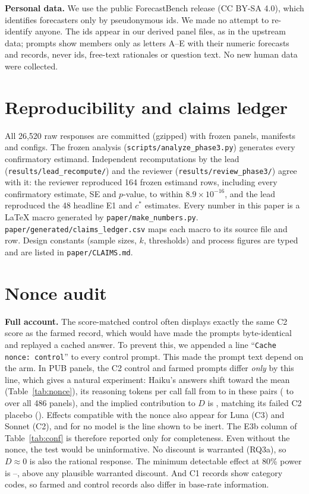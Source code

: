 \documentclass[11pt,letterpaper]{article}
\newcommand{\cstar}{c^{*}}
\begin{document}
\textbf{Personal data.} We use the public ForecastBench release (CC BY-SA 4.0), which identifies forecasters only by
pseudonymous ids. We made no attempt to re-identify anyone. The ids appear in our derived panel files, as in the
upstream data; prompts show members only as letters A--E with their numeric forecasts and records, never ids,
free-text rationales or question text. No new human data were collected.

\section{Reproducibility and claims ledger}\label{app:repro}
All 26,520 raw responses are committed (gzipped) with frozen panels, manifests and configs. The frozen analysis
(\texttt{scripts/analyze\_phase3.py}) generates every confirmatory estimand. Independent recomputations by the lead
(\texttt{results/lead\_recompute/}) and the reviewer (\texttt{results/review\_phase3/}) agree with it: the reviewer
reproduced 164 frozen estimand rows, including every confirmatory estimate, SE and $p$-value, to within
$8.9\times10^{-16}$, and the lead reproduced the 48 headline E1 and $\cstar$ estimates. Every number in this paper is a \LaTeX{} macro generated by
\texttt{paper/make\_numbers.py}. \texttt{paper/generated/claims\_ledger.csv} maps each macro to its source file and row.
Design constants (sample sizes, $k$, thresholds) and process figures are typed and are listed in
\texttt{paper/CLAIMS.md}.

\section{Nonce audit}\label{app:nonce}
\textbf{Full account.} The score-matched control often displays exactly the same C2 score as the
farmed record, which would have made the prompts byte-identical and replayed a cached answer. To prevent this, we
appended a line ``\texttt{Cache nonce: control}'' to every control prompt. This made the prompt text depend on the arm.
In \nonceHaikuN{} PUB panels, the C2 control and farmed prompts differ \emph{only} by this line, which gives a natural
experiment: Haiku's answers shift toward the mean (Table~\ref{tab:nonce}), its reasoning tokens per call fall
from \nonceTokFarm{} to \nonceTokCtl{} in these pairs (\nonceTokFarmAll{} to \nonceTokCtlAll{} over all 486 panels), and the implied contribution to $D$ is \nonceHaikuD{}, matching its failed C2 placebo
(\placeboHaikuDtwo{}). Effects compatible with the nonce also appear for Luna (C3) and Sonnet (C2), and for no model is the
line shown to be inert. The E3b column of Table~\ref{tab:conf} is therefore reported only for completeness. Even
without the nonce, the test would be uninformative. No discount is warranted (RQ3a), so $D\approx0$ is also the rational
response. The minimum detectable effect at 80\% power is \mdeMin--\mdeMax, above any plausible warranted discount. And C1
records show category codes, so farmed and control records also differ in base-rate information.
\end{document}

